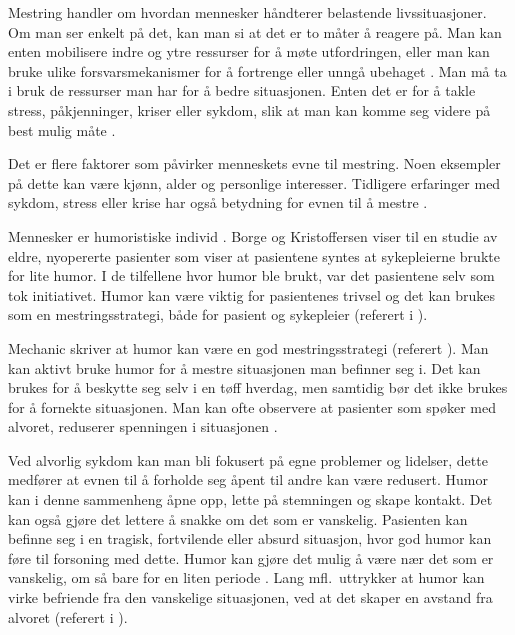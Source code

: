 Mestring handler om hvordan mennesker håndterer belastende livssituasjoner. Om
man ser enkelt på det, kan man si at det er to måter å reagere på. Man kan
enten mobilisere indre og ytre ressurser for å møte utfordringen, eller man kan
bruke ulike forsvarsmekanismer for å fortrenge eller unngå ubehaget
\cite[s.~157]{reitan2006}. Man må ta i bruk de ressurser man har for å bedre
situasjonen. Enten det er for å takle stress, påkjenninger, kriser eller
sykdom, slik at man kan komme seg videre på best mulig måte
\cite[s.~64]{heggen2010}.

Det er flere faktorer som påvirker menneskets evne til mestring. Noen eksempler
på dette kan være kjønn, alder og personlige interesser. Tidligere erfaringer
med sykdom, stress eller krise har også betydning for evnen til å mestre
\cite[s.~58]{reitan2008.kommunikasjon}.

Mennesker er humoristiske individ \cite[s.~242]{eide2008}. Borge og
Kristoffersen viser til en studie av eldre, nyopererte pasienter som viser at
pasientene syntes at sykepleierne brukte for lite humor. I de tilfellene hvor
humor ble brukt, var det pasientene selv som tok initiativet. Humor kan være
viktig for pasientenes trivsel og det kan brukes som en mestringsstrategi, både
for pasient og sykepleier (referert i ).

Mechanic skriver at humor kan være en god mestringsstrategi (referert
). Man kan aktivt bruke humor for å mestre situasjonen
man befinner seg i. Det kan brukes for å beskytte seg selv i en tøff hverdag,
men samtidig bør det ikke brukes for å fornekte situasjonen. Man kan ofte
observere at pasienter som spøker med alvoret, reduserer spenningen i
situasjonen \cite[s.~164]{wist2002}.

Ved alvorlig sykdom kan man bli fokusert på egne problemer og lidelser, dette
medfører at evnen til å forholde seg åpent til andre kan være redusert. Humor
kan i denne sammenheng åpne opp, lette på stemningen og skape kontakt. Det kan
også gjøre det lettere å snakke om det som er vanskelig. Pasienten kan befinne
seg i en tragisk, fortvilende eller absurd situasjon, hvor god humor kan føre
til forsoning med dette. Humor kan gjøre det mulig å være nær det som er
vanskelig, om så bare for en liten periode \cite[s.~244--245]{eide2008}. Lang
mfl.~uttrykker at humor kan virke befriende fra den vanskelige situasjonen, ved
at det skaper en avstand fra alvoret (referert i ).
